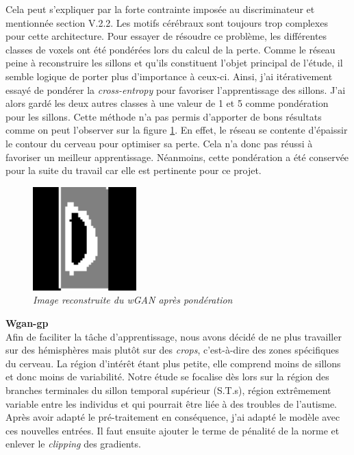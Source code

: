 \documentclass[12pt, oneside, a4paper, titlepage]{article}
\begin{document}
Cela peut s'expliquer par la forte contrainte imposée au discriminateur et mentionnée section V.2.2. Les motifs cérébraux sont toujours trop complexes pour cette architecture. 
Pour essayer de résoudre ce problème, les différentes classes de voxels ont été pondérées lors du calcul de la perte. Comme le réseau peine à reconstruire les sillons et qu'ils constituent l'objet principal de l'étude, il semble logique de porter plus d'importance à ceux-ci. Ainsi, j'ai itérativement essayé de pondérer la \textit{cross-entropy} pour favoriser l'apprentissage des sillons. J'ai alors gardé les deux autres classes à une valeur de 1 et 5 comme pondération pour les sillons. Cette méthode n'a pas permis d'apporter de bons résultats comme on peut l'observer sur la figure \ref{fig:res_wGAN2}. En effet, le réseau se contente d'épaissir le contour du cerveau pour optimiser sa perte. Cela n'a donc pas réussi à favoriser un meilleur apprentissage. Néanmoins, cette pondération a été conservée pour la suite du travail car elle est pertinente pour ce projet.

\begin{figure}[H]
    \centering
\includegraphics[width=4cm, height=4cm]{target4_180.png}
    \caption{\textit{Image reconstruite du wGAN après pondération}}
    \label{fig:res_wGAN2}
\end{figure}

\textbf{Wgan-gp}\\

Afin de faciliter la tâche d'apprentissage, nous avons décidé de ne plus travailler sur des hémisphères mais plutôt sur des\textit{ crops}, c'est-à-dire des zones spécifiques du cerveau. La région d'intérêt étant plus petite, elle comprend moins de sillons et donc moins de variabilité. Notre étude se focalise dès lors sur la région des branches terminales du sillon temporal supérieur (S.T.s), région extrêmement variable entre les individus et qui pourrait être liée à des troubles de l'autisme. Après avoir adapté le pré-traitement en conséquence, j'ai adapté le modèle avec ces nouvelles entrées. Il faut ensuite ajouter le terme de pénalité de la norme et enlever le \textit{clipping }des gradients.
\end{document}
